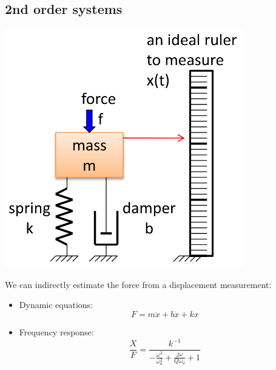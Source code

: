 \documentclass[11pt]{article}
\begin{document}
\subsection{2nd order systems}
\label{sec:org9df54ff}
\begin{center}
\includegraphics[width=.9\linewidth]{./images/second-order-systems-diagram.png}
\end{center}
We can indirectly estimate the force from a displacement measurement:
\begin{itemize}
\item Dynamic equations:
\[F = m \ddot{x} + b \dot{x} + kx\]
\item Frequency response:
\[\frac{X}{F} = \frac{k^{-1}}{- \frac{\omega^2}{\omega_0^2} + \frac{j \omega}{Q \omega_0} + 1}\]
\end{itemize}
\end{document}
